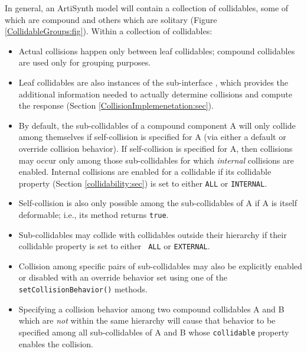 In general, an ArtiSynth model will contain a collection of
collidables, some of which are compound and others which are
solitary (Figure \ref{CollidableGroups:fig}).  Within a collection of
collidables:

\begin{itemize}

\item Actual collisions happen only between leaf collidables; compound
collidables are used only for grouping purposes.

\item Leaf collidables are also instances of the sub-interface
, which provides the
additional information needed to actually determine collisions and
compute the response (Section \ref{CollisionImplemenetation:sec}).

\item By default, the sub-collidables of a compound component A will
only collide among themselves if self-collision is specified for A
(via either a default or override collision behavior). If
self-collision is specified for A, then collisions may occur only
among those sub-collidables for which {\it internal} collisions are
enabled.  Internal collisions are enabled for a collidable if its {\sf
collidable} property (Section \ref{collidability:sec}) is set to
either {\tt ALL} or {\tt INTERNAL}.

\item Self-collision is also only possible among the sub-collidables
of A if A is itself deformable; i.e., its
method returns {\tt true}.

\item Sub-collidables may collide with collidables outside their
hierarchy if their {\sf collidable} property is set to either {\tt
ALL} or {\tt EXTERNAL}.

\item Collision among specific pairs of sub-collidables may also be
explicitly enabled or disabled with an override behavior set using one
of the {\tt setCollisionBehavior()} methods.

\item Specifying a collision behavior among two compound collidables A
and B which are {\it not} within the same hierarchy will cause that
behavior to be specified among all sub-collidables of A and B whose
{\tt collidable} property enables the collision.

\end{itemize}


